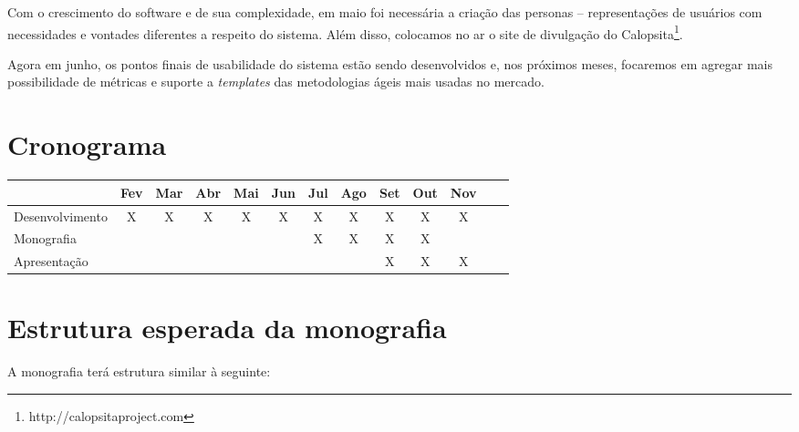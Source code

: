 \documentclass[titlepage]{article}
\begin{document}
Com o crescimento do software e de sua complexidade, em maio foi necessária a criação das personas -- representações de usuários com necessidades e vontades diferentes a respeito do sistema. Além disso, colocamos no ar o site de divulgação do Calopsita\footnote{http://calopsitaproject.com}.

Agora em junho, os pontos finais de usabilidade do sistema estão sendo desenvolvidos e, nos próximos meses, focaremos em agregar mais possibilidade de métricas e suporte a \textit{templates} das metodologias ágeis mais usadas no mercado.

\section{Cronograma}
{\small
\begin{tabular}{|l|c|c|c|c|c|c|c|c|c|c|c|c|}
  \hline
  & Fev & Mar & Abr & Mai & Jun & Jul & Ago & Set & Out & Nov \\ \hline
  Desenvolvimento	& X& X& X& X& X& X& X& X& X& X \\ \hline
  Monografia			&  &  &  &  &  & X& X& X& X&   \\ \hline
  Apresentação 		&  &  &  &  &  &  &  & X& X& X \\ \hline
\end{tabular}}

\section{Estrutura esperada da monografia}

A monografia terá estrutura similar à seguinte:
\end{document}
